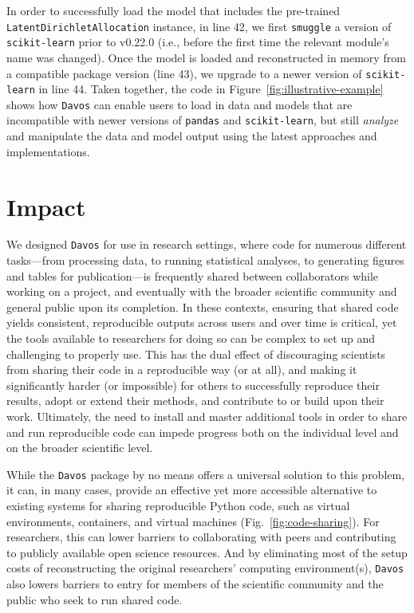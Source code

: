 \documentclass[preprint,12pt,a4paper]{elsarticle}
\begin{document}
In order to successfully load the model that includes the pre-trained
\texttt{Latent\-Dirichlet\-Allocation} instance, in line 42, we first
\texttt{smuggle} a version of \texttt{scikit-learn} prior to v0.22.0 (i.e.,
before the first time the relevant module's name was changed). Once
the model is loaded and reconstructed in memory from a compatible
package version (line 43), we upgrade to a newer version of
\texttt{scikit-learn} in line 44. Taken together, the code in
Figure~\ref{fig:illustrative-example} shows how \texttt{Davos} can
enable users to load in data and models that are incompatible with
newer versions of \texttt{pandas} and \texttt{scikit-learn}, but still
\textit{analyze} and manipulate the data and model output using the
latest approaches and implementations.


\section{Impact}

We designed \texttt{Davos} for use in research settings, where code for numerous different tasks---from processing data, to running statistical analyses, to generating figures and tables for publication---is frequently shared between collaborators while working on a project, and eventually with the broader scientific community and general public upon its completion.
In these contexts, ensuring that shared code yields consistent, reproducible outputs across users and over time is critical, yet the tools available to researchers for doing so can be complex to set up and challenging to properly use.
This has the dual effect of discouraging scientists from sharing their code in a reproducible way (or at all), and making it significantly harder (or impossible) for others to successfully reproduce their results, adopt or extend their methods, and contribute to or build upon their work.
Ultimately, the need to install and master additional tools in order to share and run reproducible code can impede progress both on the individual level and on the broader scientific level.

While the \texttt{Davos} package by no means offers a universal solution to this problem, it can, in many cases, provide an effective yet more accessible alternative to existing systems for sharing reproducible Python code, such as virtual environments, containers, and virtual machines (Fig.~\ref{fig:code-sharing}).
For researchers, this can lower barriers to collaborating with peers and contributing to publicly available open science resources.
And by eliminating most of the setup costs of reconstructing the original researchers' computing environment(s), \texttt{Davos} also lowers barriers to entry for members of the scientific community and the public who seek to run shared code.
\end{document}
